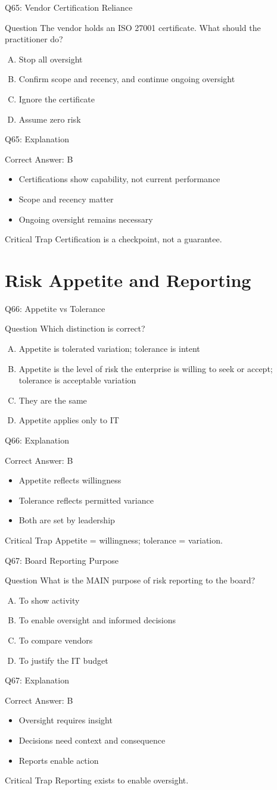\documentclass[aspectratio=169]{beamer}
\newcommand{\hq}[7]{%
	\begin{frame}{Q#1: #2}
		\begin{block}{Question}
			#3
		\end{block}
		\begin{enumerate}[(A)]
			#4
		\end{enumerate}
	\end{frame}
	\begin{frame}{Q#1: Explanation}
		\begin{block}{Correct Answer: #5}
			\begin{itemize}
				#6
			\end{itemize}
		\end{block}
		\begin{alertblock}{Critical Trap}
			#7
		\end{alertblock}
	\end{frame}
}
\begin{document}
	\hq{65}{Vendor Certification Reliance}
	{The vendor holds an ISO 27001 certificate. What should the practitioner do?}
	{\item Stop all oversight
		\item Confirm scope and recency, and continue ongoing oversight
		\item Ignore the certificate
		\item Assume zero risk}
	{B}
	{\item Certifications show capability, not current performance
		\item Scope and recency matter
		\item Ongoing oversight remains necessary}
	{Certification is a checkpoint, not a guarantee.}
	
	\section{Risk Appetite and Reporting}
	
	\hq{66}{Appetite vs Tolerance}
	{Which distinction is correct?}
	{\item Appetite is tolerated variation; tolerance is intent
		\item Appetite is the level of risk the enterprise is willing to seek or accept; tolerance is acceptable variation
		\item They are the same
		\item Appetite applies only to IT}
	{B}
	{\item Appetite reflects willingness
		\item Tolerance reflects permitted variance
		\item Both are set by leadership}
	{Appetite = willingness; tolerance = variation.}
	
	\hq{67}{Board Reporting Purpose}
	{What is the MAIN purpose of risk reporting to the board?}
	{\item To show activity
		\item To enable oversight and informed decisions
		\item To compare vendors
		\item To justify the IT budget}
	{B}
	{\item Oversight requires insight
		\item Decisions need context and consequence
		\item Reports enable action}
	{Reporting exists to enable oversight.}
	
\end{document}
